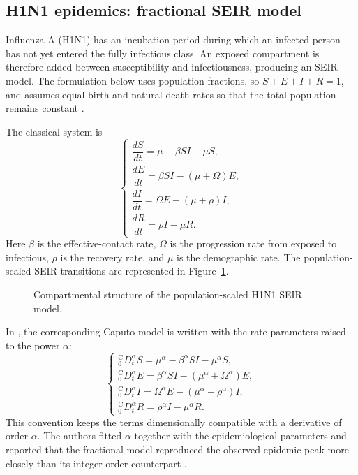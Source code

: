 \documentclass[00-main.tex]{subfiles}
\begin{document}
\subsection{H1N1 epidemics: fractional SEIR model}

Influenza A (H1N1) has an incubation period during which an infected person has not yet entered the fully infectious class.
An exposed compartment is therefore added between susceptibility and infectiousness, producing an SEIR model. The formulation below uses population fractions, so $S+E+I+R=1$, and assumes equal birth and natural-death rates so that the total population remains constant \cite{Ch21,Parra14}.

The classical system is
\[
\begin{cases}
 \dfrac{dS}{dt}=\mu-\beta SI-\mu S,\\[8pt]
 \dfrac{dE}{dt}=\beta SI-(\mu+\Omega)E,\\[8pt]
 \dfrac{dI}{dt}=\Omega E-(\mu+\rho)I,\\[8pt]
 \dfrac{dR}{dt}=\rho I-\mu R.
\end{cases}
\]
Here $\beta$ is the effective-contact rate, $\Omega$ is the progression rate from exposed to infectious, $\rho$ is the recovery rate, and $\mu$ is the demographic rate.
The population-scaled SEIR transitions are represented in Figure~\ref{fig:h1n1-seir}.

\begin{figure}[htbp]
\centering
{}
\caption{Compartmental structure of the population-scaled H1N1 SEIR model.}
\label{fig:h1n1-seir}
\end{figure}

In \cite{Parra14}, the corresponding Caputo model is written with the rate parameters raised to the power $\alpha$:
\[
\begin{cases}
 {}_{0}^{\mathrm C}\!D_t^\alpha S=\mu^\alpha-\beta^\alpha SI-\mu^\alpha S,\\[3pt]
 {}_{0}^{\mathrm C}\!D_t^\alpha E=\beta^\alpha SI-(\mu^\alpha+\Omega^\alpha)E,\\[3pt]
 {}_{0}^{\mathrm C}\!D_t^\alpha I=\Omega^\alpha E-(\mu^\alpha+\rho^\alpha)I,\\[3pt]
 {}_{0}^{\mathrm C}\!D_t^\alpha R=\rho^\alpha I-\mu^\alpha R.
\end{cases}
\]
This convention keeps the terms dimensionally compatible with a derivative of order $\alpha$. The authors fitted $\alpha$ together with the epidemiological parameters and reported that the fractional model reproduced the observed epidemic peak more closely than its integer-order counterpart \cite{Parra14}.
\end{document}
